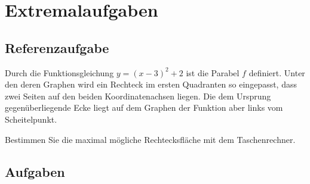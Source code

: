 
\section{Extremalaufgaben}


\subsection{Referenzaufgabe}
Durch die Funktionsgleichung $y=(x-3)^2+2$ ist die Parabel $f$ definiert.
Unter den deren Graphen wird ein Rechteck im ersten
Quadranten so eingepasst,
dass zwei Seiten auf den beiden Koordinatenachsen liegen. Die dem Ursprung
gegenüberliegende Ecke liegt auf dem Graphen der Funktion aber links
vom Scheitelpunkt.

Bestimmen Sie die maximal mögliche Rechtecksfläche mit dem Taschenrechner.



\subsection*{Aufgaben}

\newpage
